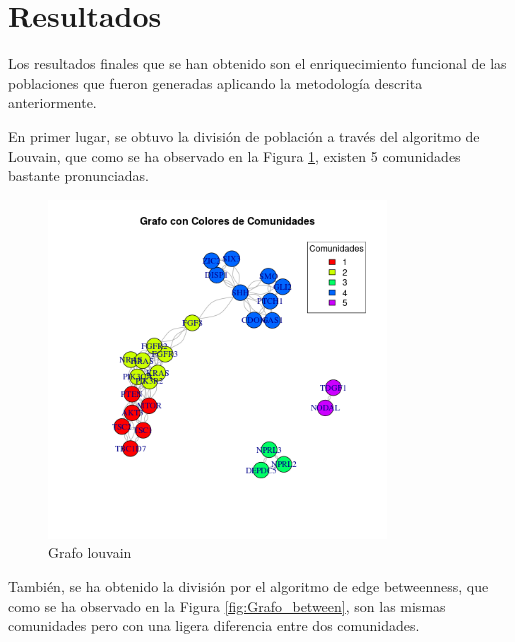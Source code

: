 \section{Resultados}

Los resultados finales que se han obtenido son el enriquecimiento funcional de las poblaciones que fueron generadas aplicando la metodología descrita anteriormente.

En primer lugar, se obtuvo la división de población a través del algoritmo de Louvain, que como se ha observado en la Figura \ref{fig:Grafo_louvain}, existen 5 comunidades bastante pronunciadas.

\begin{figure}[h!]
	\centering
	\includegraphics[width=0.8\textwidth]{figures/grafo_colores_comunidades.png}
	\caption{Grafo louvain}
	\label{fig:Grafo_louvain}
\end{figure}

También, se ha obtenido la división por el algoritmo de edge betweenness, que como se ha observado en la Figura \ref{fig:Grafo_between}, son las mismas comunidades pero con una ligera diferencia entre dos comunidades.

